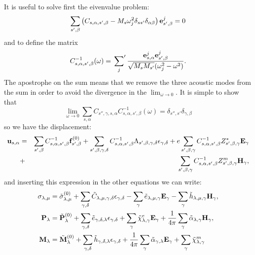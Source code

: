 \documentclass[12pt,a4paper,twoside]{report}
\begin{document}
{It is useful to solve first the eivenvalue problem:
\begin{equation}
\sum_{s',\beta} \left(C_{s,\alpha,s',\beta} - 
M_s \omega_j^2 \delta_{ss'}\delta_{\alpha\beta}\right){\bf e}^j_{s',\beta}=0
\end{equation}
and to define the matrix
\begin{equation}
C^{-1}_{s,\alpha,s',\beta}(\omega) = \sideset{}{'}\sum_j {{\bf e}^j_{s,\alpha} {\bf e}^j_{s',\beta}
\over \sqrt{M_s M_{s'}}(\omega^2_j - \omega^2)}.
\end{equation}
The apostrophe on the sum means that we remove the three acoustic modes
from the sum in order to avoid the divergence in the
$\lim_{\omega\rightarrow 0}$.
It is simple to show that
\begin{equation}
\lim_{\omega\rightarrow 0} \sum_{s,\alpha} C_{s'',\gamma,s,\alpha} C^{-1}_{s,\alpha,s',\beta}(\omega)
=\delta_{s'',s'} \delta_{\gamma,\beta}
\end{equation}
so we have the displacement:
\begin{eqnarray}
{\bf u}_{s,\alpha}&=&\sum_{s',\beta} C^{-1}_{s,\alpha,s',\beta}
{\bf f}^{(0)}_{s',\beta} + \sum_{s',\beta,\gamma,\delta} 
C^{-1}_{s,\alpha,s',\beta}
\Lambda_{s',\beta,\gamma,\delta} \epsilon_{\gamma,\delta}
+ e \sum_{s',\beta,\gamma} C^{-1}_{s,\alpha,s',\beta}
Z^*_{s',\beta,\gamma} {\bf E}_{\gamma} \nonumber \\
&+& \sum_{s',\beta,\gamma} C^{-1}_{s,\alpha,s',\beta} Z^m_{s',\beta,\gamma} 
{\bf H}_{\gamma},
\end{eqnarray}
and inserting this expression in the other equations we can write:
\begin{align}
\sigma_{\lambda,\mu}&= \tilde \sigma_{\lambda,\mu}^{(0)}
+\sum_{\gamma,\delta} \tilde C_{\lambda,\mu,\gamma,\delta}  
\epsilon_{\gamma,\delta} -
\sum_{\gamma} \tilde e_{\lambda,\mu,\gamma} 
 {\bf E}_{\gamma}
-\sum_{\gamma}  \tilde h_{\lambda,\mu,\gamma} 
{\bf H}_{\gamma}, \\
{\bf P}_{\lambda}&= \tilde {\bf P}^{(0)}_{\lambda}
+\sum_{\gamma,\delta} \tilde e_{\gamma,\delta,\lambda} 
\epsilon_{\gamma,\delta} +
\sum_{\gamma} 
\tilde \chi^e_{\lambda,\gamma}
{\bf E}_{\gamma} +
{1\over 4 \pi}\sum_{\gamma} \tilde \alpha_{\lambda,\gamma} 
{\bf H}_{\gamma}, \\
{\bf M}_{\lambda}&= \tilde {\bf M}^{(0)}_{\lambda}
+\sum_{\gamma,\delta}  \tilde h_{\gamma,\delta,\lambda} 
\epsilon_{\gamma,\delta} 
+{1\over 4 \pi} \sum_{\gamma} \tilde \alpha_{\gamma,\lambda} {\bf E}_{\gamma}
+\sum_{\gamma} 
\tilde \chi^m_{\lambda,\gamma}

\end{align}}
\end{document}
